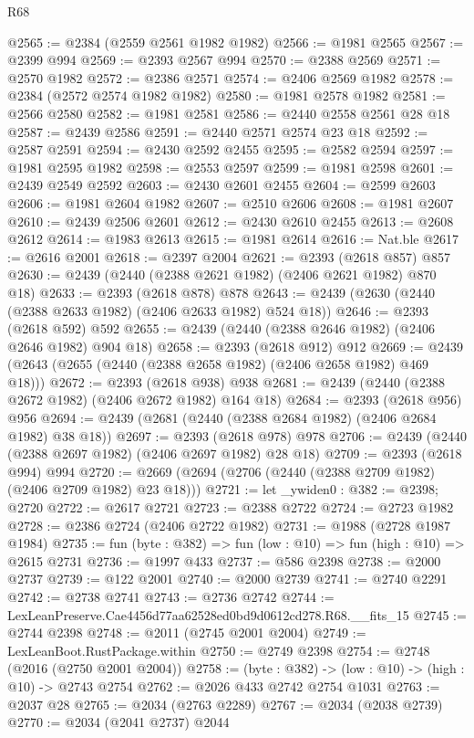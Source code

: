 \begin{lexlean}{R68}
\begin{coremodule}
@2565 := @2384 (@2559 @2561 @1982 @1982)
@2566 := @1981 @2565
@2567 := @2399 @994
@2569 := @2393 @2567 @994
@2570 := @2388 @2569
@2571 := @2570 @1982
@2572 := @2386 @2571
@2574 := @2406 @2569 @1982
@2578 := @2384 (@2572 @2574 @1982 @1982)
@2580 := @1981 @2578 @1982
@2581 := @2566 @2580
@2582 := @1981 @2581
@2586 := @2440 @2558 @2561 @28 @18
@2587 := @2439 @2586
@2591 := @2440 @2571 @2574 @23 @18
@2592 := @2587 @2591
@2594 := @2430 @2592 @2455
@2595 := @2582 @2594
@2597 := @1981 @2595 @1982
@2598 := @2553 @2597
@2599 := @1981 @2598
@2601 := @2439 @2549 @2592
@2603 := @2430 @2601 @2455
@2604 := @2599 @2603
@2606 := @1981 @2604 @1982
@2607 := @2510 @2606
@2608 := @1981 @2607
@2610 := @2439 @2506 @2601
@2612 := @2430 @2610 @2455
@2613 := @2608 @2612
@2614 := @1983 @2613
@2615 := @1981 @2614
@2616 := Nat.ble
@2617 := @2616 @2001
@2618 := @2397 @2004
@2621 := @2393 (@2618 @857) @857
@2630 := @2439 (@2440 (@2388 @2621 @1982) (@2406 @2621 @1982) @870 @18)
@2633 := @2393 (@2618 @878) @878
@2643 := @2439 (@2630 (@2440 (@2388 @2633 @1982) (@2406 @2633 @1982) @524 @18))
@2646 := @2393 (@2618 @592) @592
@2655 := @2439 (@2440 (@2388 @2646 @1982) (@2406 @2646 @1982) @904 @18)
@2658 := @2393 (@2618 @912) @912
@2669 := @2439 (@2643 (@2655 (@2440 (@2388 @2658 @1982) (@2406 @2658 @1982) @469 @18)))
@2672 := @2393 (@2618 @938) @938
@2681 := @2439 (@2440 (@2388 @2672 @1982) (@2406 @2672 @1982) @164 @18)
@2684 := @2393 (@2618 @956) @956
@2694 := @2439 (@2681 (@2440 (@2388 @2684 @1982) (@2406 @2684 @1982) @38 @18))
@2697 := @2393 (@2618 @978) @978
@2706 := @2439 (@2440 (@2388 @2697 @1982) (@2406 @2697 @1982) @28 @18)
@2709 := @2393 (@2618 @994) @994
@2720 := @2669 (@2694 (@2706 (@2440 (@2388 @2709 @1982) (@2406 @2709 @1982) @23 @18)))
@2721 := let _ywiden0 : @382 := @2398; @2720
@2722 := @2617 @2721
@2723 := @2388 @2722
@2724 := @2723 @1982
@2728 := @2386 @2724 (@2406 @2722 @1982)
@2731 := @1988 (@2728 @1987 @1984)
@2735 := fun (byte : @382) => fun (low : @10) => fun (high : @10) => @2615 @2731
@2736 := @1997 @433
@2737 := @586 @2398
@2738 := @2000 @2737
@2739 := @122 @2001
@2740 := @2000 @2739
@2741 := @2740 @2291
@2742 := @2738 @2741
@2743 := @2736 @2742
@2744 := LexLeanPreserve.Cae4456d77aa62528ed0bd9d0612cd278.R68.__fits_15
@2745 := @2744 @2398
@2748 := @2011 (@2745 @2001 @2004)
@2749 := LexLeanBoot.RustPackage.within
@2750 := @2749 @2398
@2754 := @2748 (@2016 (@2750 @2001 @2004))
@2758 := (byte : @382) -> (low : @10) -> (high : @10) -> @2743 @2754
@2762 := @2026 @433 @2742 @2754 @1031
@2763 := @2037 @28
@2765 := @2034 (@2763 @2289)
@2767 := @2034 (@2038 @2739)
@2770 := @2034 (@2041 @2737) @2044

\end{coremodule}
\end{lexlean}

